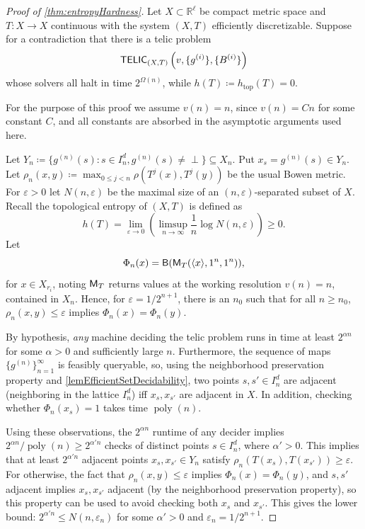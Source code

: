\documentclass{amsart}
\theoremstyle{theorem}
\theoremstyle{remark}
\numberwithin{equation}{section}
\DeclareMathOperator{\poly}{poly}
\newcommand{\RR}{\mathbb{R}}
\newcommand{\ccB}{\textsf{\upshape B}}
\newcommand{\ccM}{\textsf{\upshape M}}
\newcommand{\ccTELIC}{\textsf{\upshape TELIC}}
\begin{document}
\begin{proof}[Proof of  \cref{thm:entropyHardness}]
Let $X\subset \RR^\ell$ be compact metric space and $T:X\rightarrow X$ continuous with the system $(X,T)$ efficiently discretizable. Suppose for a contradiction that there is a telic problem
\[
\ccTELIC_{(X, T)}\left(v,\{g^{(i)}\},\{B^{(i)}\}\right)
\]
whose solvers all halt in time $2^{\Omega(n)}$, while $h(T)\coloneqq h_{\text{top}}(T) = 0$.

For the purpose of this proof we assume $v(n)=n$, since $v(n) = Cn$ for some constant $C$, and all constants are absorbed in the asymptotic arguments used here.

Let $Y_n \coloneqq \{g^{(n)}(s): s \in I^d_n, g^{(n)}(s) \neq \perp\} \subseteq X_n$. Put $x_s = g^{(n)}(s)\in Y_n$.
Let $\rho_n(x, y) \coloneqq \max_{0\leq j < n} \rho(T^j(x), T^j(y))$ be the usual Bowen metric. For $\varepsilon>0$ let $N(n,\varepsilon)$ be the maximal size of an $(n, \varepsilon)$-separated subset of $X$. Recall the topological entropy of $(X, T)$ is defined as
\[
h(T) = \lim_{\varepsilon\rightarrow 0}\left(\limsup_{n\rightarrow \infty}\frac{1}{n} \log N(n,\varepsilon)\right) \geq 0.
\]
Let
\[
\Phi_n(x) = \ccB(\ccM_T(\langle x\rangle, 1^n, 1^n)),
\]
for $x \in X_{r_i}$, noting $\ccM_T$ returns values at the working resolution $v(n)=n$, contained in $X_n$. Hence, for $\varepsilon = 1/2^{n+1}$, there is an $n_0$ such that for all $n \geq n_0$, $\rho_n(x, y) \leq \varepsilon$ implies $\Phi_n(x) = \Phi_n(y)$.

By hypothesis, \emph{any} machine deciding the telic problem runs in time at least $2^{\alpha n}$ for some $\alpha > 0$ and sufficiently large $n$. Furthermore, the sequence of maps $\{g^{(n)}\}_{n=1}^\infty$ is feasibly queryable, so, using the neighborhood preservation property and \cref{lemEfficientSetDecidability}, two points $s, s' \in I_n^d$ are adjacent (neighboring in the lattice $I_n^d$) iff $x_s, x_{s'}$ are adjacent in $X$.
In addition, checking whether $\Phi_n(x_s) = 1$ takes time $\poly(n)$.

Using these observations, the $2^{\alpha n}$ runtime of any decider implies $2^{\alpha n}/\poly(n) \geq 2^{\alpha'n}$ checks of distinct points $s \in I^d_n$, where $\alpha'>0$. This implies that at least $2^{\alpha' n}$ adjacent points $x_s, x_{s'} \in Y_n$ satisfy $\rho_n(T(x_s), T(x_{s'}))\geq \varepsilon$. For otherwise, the fact that $\rho_n(x, y) \leq \varepsilon$ implies $\Phi_n(x) = \Phi_n(y)$, and $s, s'$ adjacent implies $x_s, x_{s'}$ adjacent (by the neighborhood preservation property), so this property can be used to avoid checking both $x_s$ and $x_{s'}$. This gives the lower bound: $2^{\alpha' n} \leq N(n, \varepsilon_n)$ for some $\alpha'>0$ and $\varepsilon_n = 1/2^{n+1}$.


\end{proof}
\end{document}
